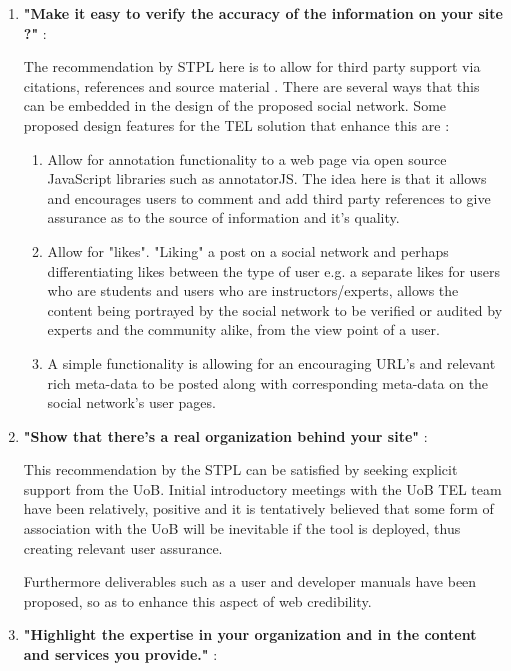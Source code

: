 \begin{enumerate}
    \item \textbf{"Make it easy to verify the accuracy of the information on your site ?"} \cite{Fogg2002a}:
    
    The recommendation by STPL here is to allow for third party support via citations, references and source material \cite{Fogg2002a}. There are several ways that this can be embedded in the design of the proposed social network. Some proposed design features for the TEL solution that enhance this are :
    \begin{enumerate}
        
        \item Allow for annotation functionality to a web page via open source JavaScript libraries such as annotatorJS. The idea here is that it allows and encourages users to comment and add third party references to give assurance as to the source of information and it's quality.
        \item Allow for "likes". "Liking" a post on a social network and perhaps differentiating likes between the type of user e.g. a separate likes for users who are students and users who are instructors/experts, allows the content being portrayed by the social network to be verified or audited by experts and the community alike, from the view point of a user.
        \item A simple functionality is allowing for an encouraging URL's and relevant rich meta-data to be posted along with corresponding meta-data on the social network's user pages.
    
    \end{enumerate}
    
    \newpage
    \item \textbf{"Show that there's a real organization behind your site"} \cite{Fogg2002a}:
    
    This recommendation by the STPL can be satisfied by seeking explicit support from the UoB.  Initial introductory meetings with the UoB TEL team have been relatively, positive and it is tentatively believed that some form of association with the UoB will be inevitable if the tool is deployed, thus creating relevant user assurance.
    
    Furthermore deliverables such as a user and developer manuals have been proposed, so as to enhance this aspect of web credibility.
            
    \item \textbf{"Highlight the expertise in your organization and in the content and services you provide."} \cite{Fogg2002a}:
    

\end{enumerate}
